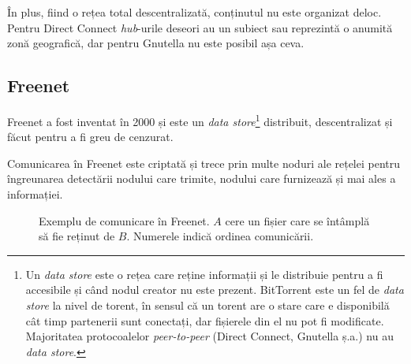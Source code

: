 \documentclass[a4wide,12pt]{report}
\newcommand{\eng}[1]{\emph{#1}} %
\begin{document}
În plus, fiind o rețea total descentralizată, conținutul nu este organizat deloc. Pentru Direct Connect \eng{hub}-urile
deseori au un subiect sau reprezintă o anumită zonă geografică, dar pentru Gnutella nu este posibil așa ceva. 

\subsection{Freenet} %

Freenet a fost inventat în 2000 și este un \eng{data store}\footnote{Un \eng{data store} este o rețea care reține
informații și le distribuie pentru a fi accesibile și când nodul creator nu este prezent. BitTorrent este un fel de
\eng{data store} la nivel de torent, în sensul că un torent are o stare care e disponibilă cât timp partenerii sunt
conectați, dar fișierele din el nu pot fi modificate. Majoritatea protocoalelor \eng{peer-to-peer} (Direct
Connect, Gnutella ș.a.) nu au \eng{data store}.} distribuit, descentralizat și făcut pentru a fi greu de
cenzurat\cite{freenet}\cite{wikifn}.

Comunicarea în Freenet este criptată și trece prin multe noduri ale rețelei pentru îngreunarea detectării nodului care
trimite, nodului care furnizează și mai ales a informației.

\begin{figure}[t]
    \centering

    \caption{Exemplu de comunicare în Freenet. $A$ cere un fișier care se întâmplă să fie reținut de $B$. Numerele
    indică ordinea comunicării.}
\end{figure}
\end{document}
